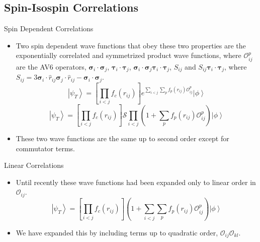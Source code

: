 \documentclass{beamer}
\newcommand{\ket}[1]{\left| #1 \right>}
\newcommand{\fpij}{f_p(r_{ij})}
\newcommand{\Opij}{\mathcal{O}_{ij}^p}
\newcommand{\ti}{\bm{\tau}_i}
\newcommand{\tj}{\bm{\tau}_j}
\newcommand{\si}{\bm{\sigma}_i}
\newcommand{\sj}{\bm{\sigma}_j}
\begin{document}
\subsection{Spin-Isospin Correlations}
\begin{frame}{Spin Dependent Correlations}
\begin{itemize}
   \item Two spin dependent wave functions that obey these two properties are the exponentially correlated and symmetrized product wave functions, where $\Opij$ are the AV6 operators, $\si\cdot\sj$, $\ti\cdot\tj$,     $\si\cdot\sj \ti\cdot\tj$, $S_{ij}$ and $S_{ij} \ti\cdot\tj$, where $S_{ij}     = 3\si\cdot\hat{r}_{ij}\sj\cdot\hat{r}_{ij}-\si\cdot\sj$.
   \begin{equation*}
      \ket{\psi_T} = \left[\prod\limits_{i<j}f_c(r_{ij})\right] e^{\sum\limits_{i<j}\sum\limits_p\fpij\Opij} \ket{\phi}
   \end{equation*}
   \begin{equation*}
      \ket{\psi_T} = \left[\prod\limits_{i<j}f_c(r_{ij})\right] \mathcal{S}\prod\limits_{i<j}\left(1+\sum\limits_p\fpij\Opij\right) \ket{\phi}
   \end{equation*}
   \item These two wave functions are the same up to second order except for  commutator terms.
\end{itemize}
\end{frame}

\begin{frame}{Linear Correlations}
\begin{itemize}
   \item Until recently these wave functions had been expanded only to linear order in $\mathcal{O}_{ij}$.
   \begin{equation*}
      \ket{\psi_T} = \left[\prod\limits_{i<j}f_c(r_{ij})\right] \left(1+\sum\limits_{i<j}\sum\limits_p\fpij\Opij\right) \ket{\phi}
   \end{equation*}
   \item We have expanded this by including terms up to quadratic order, $\mathcal{O}_{ij}\mathcal{O}_{kl}$.
\end{itemize}
\end{frame}
\end{document}
